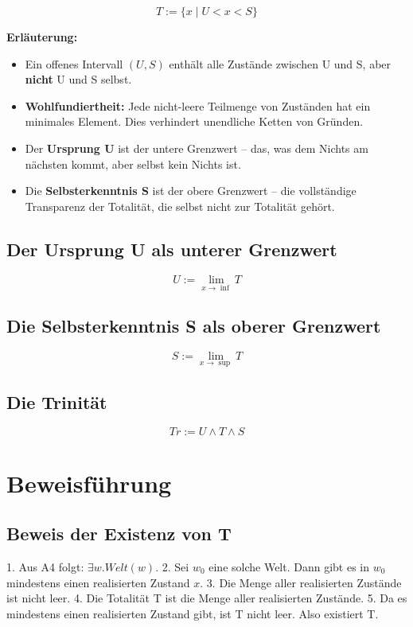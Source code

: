 \documentclass[
]{article}
\begin{document}
\[
\boxed{T := \{ x \mid U < x < S \}}
\]

\textbf{Erläuterung:}
\begin{itemize}
\item Ein offenes Intervall \((U, S)\) enthält alle Zustände zwischen U und S, aber \textbf{nicht} U und S selbst.
\item \textbf{Wohlfundiertheit:} Jede nicht-leere Teilmenge von Zuständen hat ein minimales Element. Dies verhindert unendliche Ketten von Gründen.
\item Der \textbf{Ursprung U} ist der untere Grenzwert – das, was dem Nichts am nächsten kommt, aber selbst kein Nichts ist.
\item Die \textbf{Selbsterkenntnis S} ist der obere Grenzwert – die vollständige Transparenz der Totalität, die selbst nicht zur Totalität gehört.
\end{itemize}

\subsection{Der Ursprung U als unterer Grenzwert}\label{der-ursprung-u-als-unterer-grenzwert}

\[
\boxed{U := \lim_{x \to \inf} T}
\]

\subsection{Die Selbsterkenntnis S als oberer Grenzwert}\label{die-selbsterkenntnis-s-als-oberer-grenzwert}

\[
\boxed{S := \lim_{x \to \sup} T}
\]

\subsection{Die Trinität}\label{die-trinituxe4t}

\[
\boxed{Tr := U \land T \land S}
\]

\section{Beweisführung}\label{beweisfuxfchrung}

\subsection{Beweis der Existenz von T}\label{beweis-der-existenz-von-t}

1. Aus A4 folgt: \(\exists w. Welt(w)\).
2. Sei \(w_0\) eine solche Welt. Dann gibt es in \(w_0\) mindestens einen realisierten Zustand \(x\).
3. Die Menge aller realisierten Zustände ist nicht leer.
4. Die Totalität T ist die Menge aller realisierten Zustände.
5. Da es mindestens einen realisierten Zustand gibt, ist T nicht leer. Also existiert T.
\end{document}
